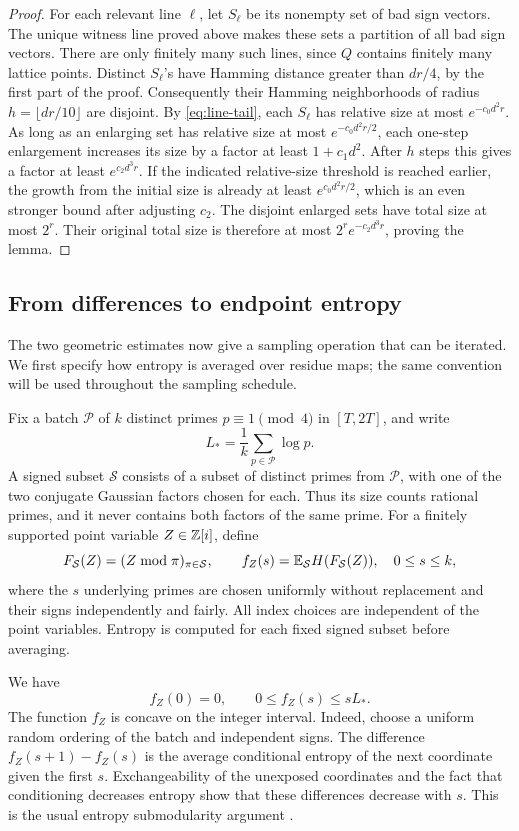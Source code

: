 \begin{proof}
For each relevant line \(\ell\), let \(S_\ell\) be its nonempty set
of bad sign vectors. The unique witness line proved above makes these
sets a partition of all bad sign vectors. There are only finitely many such lines, since \(Q\) contains
finitely many lattice points. Distinct \(S_\ell\)'s have Hamming
distance greater than \(dr/4\), by the first part of the proof.
Consequently their Hamming neighborhoods of radius
\(h=\lfloor dr/10\rfloor\) are disjoint.
By \eqref{eq:line-tail}, each \(S_\ell\) has relative size at most
\(e^{-c_0d^2r}\).
As long as an enlarging set has relative size at most
\(e^{-c_0d^2r/2}\), each one-step enlargement increases its size by a
factor at least \(1+c_1d^2\). After \(h\) steps this gives a factor
at least \(e^{c_2d^3r}\).
If the indicated relative-size threshold is reached earlier, the
growth from the initial size is already at least
\(e^{c_0d^2r/2}\), which is an even stronger bound after adjusting
\(c_2\).
The disjoint enlarged sets have total size at most \(2^r\).
Their original total size is therefore at most
\(2^re^{-c_2d^3r}\), proving the lemma.
\end{proof}

\subsection{From differences to endpoint entropy}

The two geometric estimates now give a sampling operation that can be
iterated. We first specify how entropy is averaged over residue maps;
the same convention will be used throughout the sampling schedule.

Fix a batch \(\mathcal P\) of \(k\) distinct primes \(p\equiv1\pmod4\)
in \([T,2T]\), and write
\[
 L_*=\frac1k\sum_{p\in\mathcal P}\log p.
\]
A signed subset \(\mathcal S\) consists of a subset of distinct primes
from \(\mathcal P\), with one of the two conjugate Gaussian factors
chosen for each. Thus its size counts rational primes, and it never
contains both factors of the same prime.
For a finitely supported point variable \(Z\in\mathbb Z[i]\), define
\[
 F_{\mathcal S}(Z)=(Z\bmod\pi)_{\pi\in\mathcal S},
 \qquad
 f_Z(s)=\mathbb E_{\mathcal S}H(F_{\mathcal S}(Z)),
 \quad 0\le s\le k,
\]
where the \(s\) underlying primes are chosen uniformly without
replacement and their signs independently and fairly.
All index choices are independent of the point variables.
Entropy is computed for each fixed signed subset before averaging.

We have
\[
 f_Z(0)=0,\qquad 0\le f_Z(s)\le sL_*.
\]
The function \(f_Z\) is concave on the integer interval.
Indeed, choose a uniform random ordering of the batch and independent
signs. The difference \(f_Z(s+1)-f_Z(s)\) is the average conditional
entropy of the next coordinate given the first \(s\).
Exchangeability of the unexposed coordinates and the fact that
conditioning decreases entropy show that these differences decrease
with \(s\). This is the usual entropy submodularity argument
\cite{CoverThomas}.

